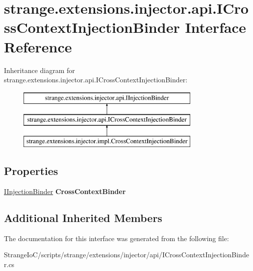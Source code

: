 \hypertarget{interfacestrange_1_1extensions_1_1injector_1_1api_1_1_i_cross_context_injection_binder}{\section{strange.\-extensions.\-injector.\-api.\-I\-Cross\-Context\-Injection\-Binder Interface Reference}
\label{interfacestrange_1_1extensions_1_1injector_1_1api_1_1_i_cross_context_injection_binder}
}
Inheritance diagram for strange.\-extensions.\-injector.\-api.\-I\-Cross\-Context\-Injection\-Binder\-:\begin{figure}[H]
\begin{center}
\leavevmode
\includegraphics[height=3.000000cm]{interfacestrange_1_1extensions_1_1injector_1_1api_1_1_i_cross_context_injection_binder}
\end{center}
\end{figure}
\subsection*{Properties}
\begin{DoxyCompactItemize}
\item 
\hypertarget{interfacestrange_1_1extensions_1_1injector_1_1api_1_1_i_cross_context_injection_binder_acc58dea0dca1d7cfb0b8e9d5c1128584}{\hyperlink{interfacestrange_1_1extensions_1_1injector_1_1api_1_1_i_injection_binder}{I\-Injection\-Binder} {\bfseries Cross\-Context\-Binder}}\label{interfacestrange_1_1extensions_1_1injector_1_1api_1_1_i_cross_context_injection_binder_acc58dea0dca1d7cfb0b8e9d5c1128584}

\end{DoxyCompactItemize}
\subsection*{Additional Inherited Members}


The documentation for this interface was generated from the following file\-:\begin{DoxyCompactItemize}
\item 
Strange\-Io\-C/scripts/strange/extensions/injector/api/I\-Cross\-Context\-Injection\-Binder.\-cs\end{DoxyCompactItemize}

